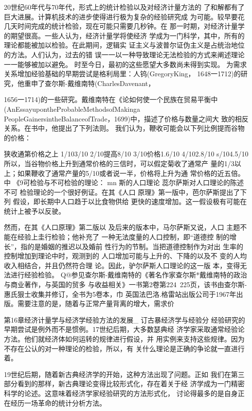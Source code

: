 20世纪60年代与70年代，形式上的统计检验以及对经济计量方法的
了和解都有了巨大进展。计算机技术的进步使得进行极为复杂的经验研究成
为可能。较早要花几天时间完成的统计检验，现在可能只需要几秒钟。在
那一时期，对经济计量学的期望很高。一些人认为，经济计量学将使经济
学成为一门科学，其中，所有的理论都能被加以检验。在此期间，逻辑实
证主义与波普尔证伪主义是占统治地位的方法。人们认为，过去的错
误一一以一种导致理论无法检验的方式来阐述理论一一能够被加以避免。
时至今日，最初的这些愿望大多数尚未得到实现。
为需求关系增加经验基础的早期尝试是格利局里：人钨(GregoryKing，
1648一1712)的研究，他重申了查尔斯-戴维南特(CharlesDavenant，

1656一1714)的一些研究。戴维南特在《论如何使一个民族在贸易平衡中
(AnEssayupontheProbableMethodsofMakinga
PeopleGainersintheBalanceofTrade，1699)中，描述了价格与数量之间大
致的相反关系。在书中，他提出了下列法则。
我们认为，鞭收可能会以下列比例提而谷物的价格：


狭收通第价格之上
1/103/10
2/10提高8/10
3/10价格1.6/10
4/102.8/10
s/104.5/10
所以，当谷物价格上升到通常价格的三信时，可以假定菊收了通常产
量的1/3以上；如果鞭收了通常产量的5/10或者说一半，价格将上升为通
常价格的近五倍。中
《9可检验与不可检验的理论：
mn
斯的人口理论
蕊尔萨斯对人口理论的陈述不可
检验理论的一个很好例证。在其《人口
原理》第一版中，芭尔萨斯提出了下列
假设，即长期中人口趋于以比食物供给
更快的速度增加。这一假设极有可能在
统计上被予以反驶。

然而，在其《人口原理》第二版以
及后来的版本中，马尔萨斯又说，人口
主题不能在经验上圭行检验；他补充了
一种无法度量的人口控制，即“道德控
制的增长”，指的是婚姻的推迟以及婚前
性行为的节制。当把道德控制作为对出
生率的控制增加到理论中时，观测到的
人口增加可能与上升的、下降的以及不
变的人均收入相结合，并且仍然符合理
论。因此，驴尔萨斯人口理论的这一版
本，变得无法进行经验检验。
Q@参见查尔斯-戴维南特的《著名作家查尔斯*戴维南特的政治与商业著作，与英国的贸多
与收益相关》一书第2卷第224~225页，该书由查尔斯-惠氏狠士收集并修订，全书为5卷本，巾
英国法巴洛.格雷站出版公司于1967年出版。需要注意的是，随着与正常产量背离的增大，需求价

第16章经济计量学与经济学经验方法的发展_
订古暴经济学与经验分
经验研究的早期尝试是例外而不是惯例。17世纪后期，大多数瑟典经
济学家采取通常经验论方法。他们就经济体如何运转的规律进行假设，并
用实例来支持这些规律。因为不存在公认的对一种理论的检验，所以，有
关什么理论是正确的争论就一直进行着。

19世纪后期，随着新古典经济学的开始，这种方法出现了问题。正如
我们在第三部分看到的那样，新古典理论变得比较形式化，存在着关于经
济学成为一门精密科学的论述。这意味着经济学家经验研究的方法形式化，
讨论得最多的是自身正在经历一场革命的统计分析方法。

